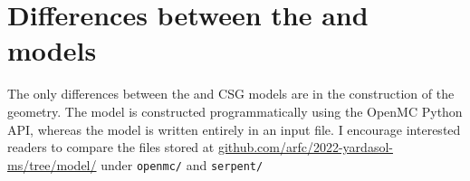 \section{Differences between the \OpenMC and \SerpentTWO models}
The only differences between the \OpenMC and \SerpentTWO CSG models are in the
construction of the geometry. The \OpenMC model is constructed programmatically
using the OpenMC Python API, whereas the \SerpentTWO model is written entirely
in an input file. I encourage interested readers to compare the files stored at
\url{github.com/arfc/2022-yardasol-ms/tree/model/} under \verb.openmc/. and
\verb.serpent/.
